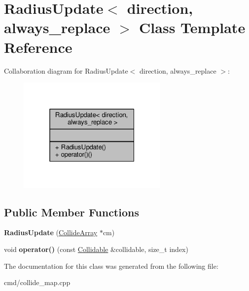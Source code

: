 \hypertarget{classRadiusUpdate}{}\section{Radius\+Update$<$ direction, always\+\_\+replace $>$ Class Template Reference}
\label{classRadiusUpdate}


Collaboration diagram for Radius\+Update$<$ direction, always\+\_\+replace $>$\+:
\nopagebreak
\begin{figure}[H]
\begin{center}
\leavevmode
\includegraphics[width=208pt]{dc/d4e/classRadiusUpdate__coll__graph}
\end{center}
\end{figure}
\subsection*{Public Member Functions}
\begin{DoxyCompactItemize}
\item 
{\bfseries Radius\+Update} (\hyperlink{classCollideArray}{Collide\+Array} $\ast$cm)\hypertarget{classRadiusUpdate_acb0357a7cc956beda427253b0e4d0ea0}{}\label{classRadiusUpdate_acb0357a7cc956beda427253b0e4d0ea0}

\item 
void {\bfseries operator()} (const \hyperlink{classCollidable}{Collidable} \&collidable, size\+\_\+t index)\hypertarget{classRadiusUpdate_a5f7560baccf483b9f8a41a10afb6ade2}{}\label{classRadiusUpdate_a5f7560baccf483b9f8a41a10afb6ade2}

\end{DoxyCompactItemize}


The documentation for this class was generated from the following file\+:\begin{DoxyCompactItemize}
\item 
cmd/collide\+\_\+map.\+cpp\end{DoxyCompactItemize}
